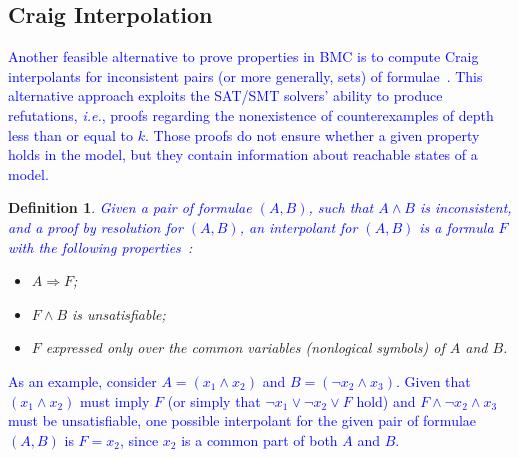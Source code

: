 \documentclass{cta-author}
\newtheorem{definition}{Definition}{}
\begin{document}
\subsection{Craig Interpolation}
\label{sec:CraigInterpolationInModelChecking}

\textcolor{blue}{Another feasible alternative to prove properties in BMC is to compute Craig interpolants for inconsistent pairs (or more generally, sets) of formulae~\cite{McMillan03,McMillan05}. This alternative approach exploits the SAT/SMT solvers' ability to produce refutations, {\it i.e.}, proofs regarding the nonexistence of counterexamples of depth less than or equal to $k$. Those proofs do not ensure whether a given property holds in the model, but they contain information about reachable states of a model.}

	\begin{definition}\label{interpolants}
		\textit{\textcolor{blue}{Given a pair of formulae $\left(A,B\right)$, such that $A \wedge B$ is inconsistent, and a proof by resolution for $\left(A,B\right)$, an \textit{interpolant} for $\left(A,B\right)$ is a formula $F$ with the following properties}~\cite{McMillan03,McMillan05}: }
		
		\begin{itemize}
			\item $A \Rightarrow F$;
			\item $F \wedge B$ \textit{is unsatisfiable};
			\item $F$ \textit{expressed only over the common variables (nonlogical symbols) of $A$ and $B$}.
		\end{itemize}
	\end{definition}

\textcolor{blue}{As an example, consider $A = \left(x_1 \wedge x_2\right)$ and $B = \left(\neg x_2 \wedge x_3\right)$. Given that $\left(x_1 \wedge x_2\right)$ must imply $F$ (or simply that $\neg x_1 \vee \neg x_2 \vee F$ hold) and $F \wedge \neg x_2 \wedge x_3$ must be unsatisfiable, one possible interpolant for the given pair of formulae $\left(A,B\right)$ is $F = x_2$, since $x_2$ is a common part of both $A$ and $B$.}
\end{document}
